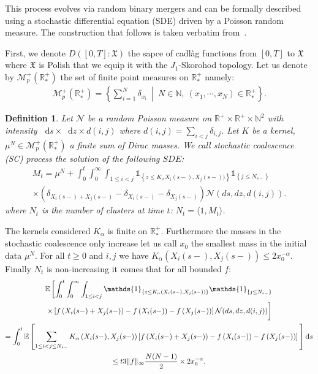 \documentclass[11pt,a4paper]{article}
\newcommand{\RR}{\mathbb{R}}
\newcommand{\NN}{\mathbb{N}}
\newcommand{\RRP}{\mathbb{R}^+_*}
\newcommand{\MC}{\mathcal{M}}
\newcommand{\NC}{\mathcal{N}}
\newcommand{\XF}{\mathfrak{X}}
\newcommand{\SC}{{\emph{SC}}}
\newcommand{\indic}[1]{\mathds{1}_{\left\lbrace#1\right\rbrace}}
\newcommand{\dd}{\mathop{}\!\mathrm{d}}
\newtheorem{definition}[theorem]{Definition}
\begin{document}
\medskip

This process evolves via random binary mergers and can be formally described using a stochastic differential equation (SDE) driven by a Poisson random measure. The construction that follows is taken verbatim from~\cite{fournier2006some,fournierStochasticCoalescenceHomogeneouslike2009}.

\medskip


First, we denote $D\left([0,T]: \XF\right)$ the sapce of cadlàg functions from $[0,T]$ to $\XF$ where $\XF$ is Polish that we equip it with the $J_1$-Skorohod topology. Let us denote by $\MC_p^+(\RRP)$ the set of finite point measures on $\RRP$ namely:
\begin{align*}
    \MC_p^+(\RRP) = \left\lbrace \sum\limits_{i = 1}^N \delta_{x_i}\  \middle|\  N\in \NN,\  (x_1,\cdots,x_N) \in \RRP \right\rbrace. 
\end{align*}
\begin{definition}
    Let $\NC$ be a random Poisson measure on $\RR^+ \times \RR^+ \times \NN^2$ with intensity $\dd s \times \dd z \times d(i,j)$ where $d(i,j) = \sum\limits_{i < j} \delta_{i,j}$. Let $K$ be a kernel, $\mu^N \in \MC_p^+(\RRP)$ a finite sum of Dirac masses. We call stochastic coalescence (\SC) process the solution of the following $SDE$:
    \begin{multline*}
        M_t = \mu^N + \int_0^t \int_0^\infty \int_{1 \leq i <j }  \indic{z \leq K_{\alpha}X_{i}(s-),X_{j}(s-))} \indic{j \leq N_{s-}} \\ \times \left(\delta_{X_{i}(s-) + X_{j}(s-)} - \delta_{X_{i}(s-)} - \delta_{X_{j}(s-)}\right)\mathcal{N}(ds,dz,d(i,j)).
    \end{multline*}
    where $N_t$ is the number of clusters at time $t$: $N_t = \langle 1 , M_t\rangle$.
\end{definition}
The kernels considered $K_\alpha$ is finite on $\RRP$. Furthermore the masses in the stochastic coalescence only increase let us call $x_0$ the smallest mass in the initial data $\mu^N$. For all $t \geq 0$ and $i,j$ we have $K_\alpha(X_{i}(s-),X_{j}(s-)) \leq 2x_0^{-\alpha}$. Finally $N_t$ is non-increasing it comes that for all bounded $f$:
\begin{multline*}
    \mathbb{E} \left[ \int_0^t \int_0^\infty \int_{1 \leq i <j }  \indic{z \leq K_{\alpha}\left(X_{i}(s-),X_{j}(s-)\right)} \indic{j \leq N_{s-}}\right. \\
    \left. \times   \left[f\left(X_{i}(s-) + X_{j}(s-)\right) - f\left(X_{i}(s-)\right) - f\left( X_{j}(s-)\right)\right]\mathcal{N}(ds,dz,d(i,j)) \vphantom{\int_0^t \int_0^\infty \int_{i <j } }\right] \\
    = \int_0^t \mathbb{E} \left[\sum\limits_{1 \leq i< j \leq N_{s-}} K_{\alpha}\left(X_{i}(s-),X_{j}(s-)\right) \left[f\left(X_{i}(s-) + X_{j}(s-)\right) - f\left(X_{i}(s-)\right) - f\left( X_{j}(s-)\right)\right] \vphantom{\int_0^t \int_0^\infty \int_{i <j } } \right] \dd s \\
    \leq t 3\|f\|_{\infty}\dfrac{N(N-1)}{2} \times 2 x_0^{-\alpha} .
\end{multline*}
\end{document}
